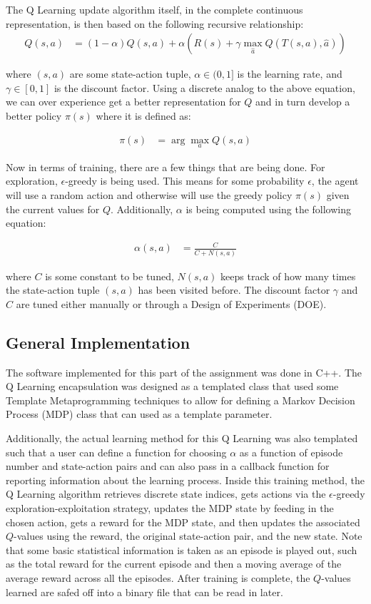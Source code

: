 \documentclass{article}[12pt]
\begin{document}
   The Q Learning update algorithm itself, in the complete continuous representation, is then based on the following recursive relationship:
   \begin{align}
   Q(s,a) &= (1 - \alpha) Q(s,a) + \alpha \left( R(s) + \gamma \max_{\hat{a}} Q( T(s,a), \hat{a})\right) \label{eq:qlrn}
   \end{align}
   
   where $(s,a)$ are some state-action tuple, $\alpha \in (0,1]$ is the learning rate, and $\gamma \in [0,1]$ is the discount factor. Using a discrete analog to the above equation, we can over experience get a better representation for $Q$ and in turn develop a better policy $\pi(s)$ where it is defined as:
   
   \begin{align}
   \pi(s) &= \arg \max_{a} Q(s,a)
   \end{align}
   
   Now in terms of training, there are a few things that are being done. For exploration, $\epsilon$-greedy is being used. This means for some probability $\epsilon$, the agent will use a random action and otherwise will use the greedy policy $\pi(s)$ given the current values for $Q$. Additionally, $\alpha$ is being computed using the following equation:
   
   \begin{align}
   \alpha(s,a) &= \frac{C}{C + N(s,a)}
   \end{align}
   
   where $C$ is some constant to be tuned, $N(s,a)$ keeps track of how many times the state-action tuple $(s,a)$ has been visited before. The discount factor $\gamma$ and $C$ are tuned either manually or through a Design of Experiments (DOE).
   
   \subsection{General Implementation}
   The software implemented for this part of the assignment was done in C++. The Q Learning encapsulation was designed as a templated class that used some Template Metaprogramming techniques to allow for defining a Markov Decision Process (MDP) class that can used as a template parameter. 
   
   Additionally, the actual learning method for this Q Learning was also templated such that a user can define a function for choosing $\alpha$ as a function of episode number and state-action pairs and can also pass in a callback function for reporting information about the learning process. Inside this training method, the Q Learning algorithm retrieves discrete state indices, gets actions via the $\epsilon$-greedy exploration-exploitation strategy, updates the MDP state by feeding in the chosen action, gets a reward for the MDP state, and then updates the associated $Q$-values using the reward, the original state-action pair, and the new state. Note that some basic statistical information is taken as an episode is played out, such as the total reward for the current episode and then a moving average of the average reward across all the episodes. After training is complete, the $Q$-values learned are safed off into a binary file that can be read in later.
   
\end{document}
